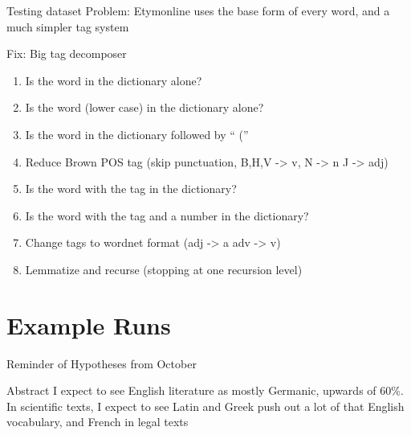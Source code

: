 \documentclass[10pt]{beamer}
\begin{document}
\begin{frame}[fragile]{Testing dataset}
  Problem: Etymonline uses the base form of every word, and a much simpler tag system

  \pause

  Fix: Big tag decomposer

  \begin{enumerate}
    \item Is the word in the dictionary alone?
    \item Is the word (lower case) in the dictionary alone?
    \item Is the word in the dictionary followed by `` (''
    \item Reduce Brown POS tag (skip punctuation, B,H,V -> v, N -> n J -> adj)
    \item Is the word with the tag in the dictionary?
    \item Is the word with the tag and a number in the dictionary?
    \item Change tags to wordnet format (adj -> a adv -> v)
    \item Lemmatize and recurse (stopping at one recursion level)
  \end{enumerate}

\end{frame}

\section{Example Runs}

\begin{frame}[fragile]{Reminder of Hypotheses from October}

  \begin{block}{Abstract}
    I expect to see English literature as mostly Germanic, upwards of 60\%. In scientific texts, I expect to see Latin and Greek push out a lot of that English vocabulary, and French in legal texts
  \end{block}

\end{frame}
\end{document}

